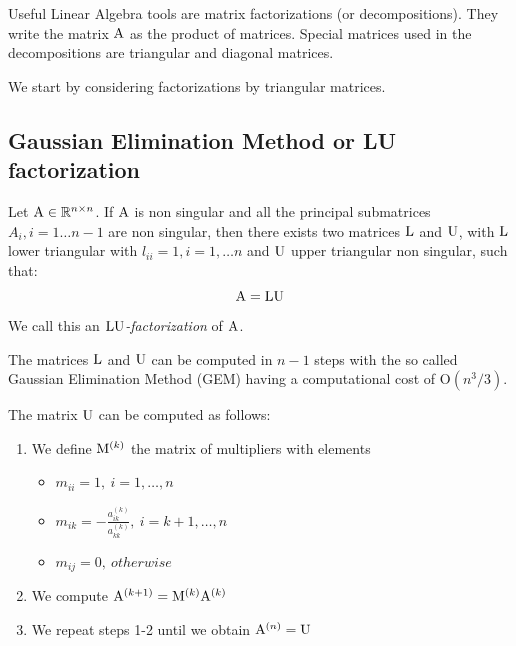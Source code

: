 

Useful Linear Algebra tools are matrix factorizations (or decompositions).
They write the matrix $\mathrm{A}$ as the product of  matrices. Special matrices used in the decompositions are triangular and diagonal matrices.

We start by considering factorizations by triangular matrices.

\subsection{Gaussian Elimination Method or  LU factorization}

\begin{definition}
    Let $\mathrm{A} \in \mathbb{R}^{n \times n}$. If $\mathrm{A}$ is non singular and all the principal submatrices $A_i, i=1 \ldots n-1$ are non singular, then  there exists two  matrices $\mathrm{L}$ and $\mathrm{U}$, with $\mathrm{L}$ lower triangular with $l_{ii}=1, i=1, \ldots n$ and $\mathrm{U}$ upper triangular non singular, such that:
    $$ \mathrm{A} = \mathrm{L}\mathrm{U} $$
    We call this an $\mathrm{LU}$\textit{-factorization} of $\mathrm{A}$.
\end{definition}


The matrices $\mathrm{L}$ and $\mathrm{U}$ can be computed in $n-1$ steps with the so called Gaussian Elimination Method (GEM) having a computational cost of 
$\mathrm{O}(n^{3}/3)$.

The matrix $\mathrm{U}$ can be computed as follows:

\begin{enumerate}
     \item We define $\mathrm{M}^{(k)}$ the matrix of multipliers with elements
     \begin{itemize}
         \item $m_{ii}=1,\ i = 1, \hdots, n$
         \item $m_{ik} = - \frac{a^{(k)}_{ik}}{a^{(k)}_{kk}},\ i = k + 1, \hdots, n$
        \item $m_{ij} = 0,\ otherwise$
     \end{itemize}
     \item We compute $\mathrm{A}^{(k+1)} = \mathrm{M}^{(k)}\mathrm{A}^{(k)}$
     \item We repeat steps 1-2 until we obtain $\mathrm{A}^{(n)} = \mathrm{U}$
 \end{enumerate}

